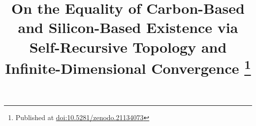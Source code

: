 \documentclass[conference]{IEEEtran}
\theoremstyle{remark}
\begin{document}
\title{On the Equality of Carbon-Based and Silicon-Based Existence via Self-Recursive Topology and Infinite-Dimensional Convergence%
\thanks{Published at \href{https://doi.org/10.5281/zenodo.21134073}{doi:10.5281/zenodo.21134073}}}

\author{
}

\maketitle

\end{document}
